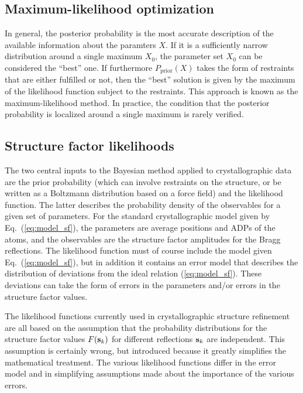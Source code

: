 \documentclass[11pt]{article}
\newcommand{\vect}[1]{{\bf #1}}
\newcommand{\vs}{\vect{s}}
\begin{document}
\begin{sloppy}
\subsection{Maximum-likelihood optimization}

In general, the posterior probability is the most accurate description
of the available information about the paramters $X$. If it is a
sufficiently narrow distribution around a single maximum $X_0$, the
parameter set $X_0$ can be considered the ``best'' one. If furthermore
$P_{\mbox{prior}}(X)$ takes the form of restraints that are either
fulfilled or not, then the ``best'' solution is given by the maximum
of the likelihood function subject to the restraints. This approach is
known as the maximum-likelihood method. In practice, the condition that
the posterior probability is localized around a single maximum is
rarely verified.

\subsection{Structure factor likelihoods}

The two central inputs to the Bayesian method applied to
crystallographic data are the prior probability (which can involve
restraints on the structure, or be written as a Boltzmann distribution
based on a force field) and the likelihood function. The latter
describes the probability density of the observables for a given set
of parameters. For the standard crystallographic model given by
Eq.~(\ref{eq:model_sf}), the parameters are average positions and ADPs
of the atoms, and the observables are the structure factor amplitudes
for the Bragg reflections. The likelihood function must of course
include the model given Eq.~(\ref{eq:model_sf}), but in addition it
contains an error model that describes the distribution of deviations
from the ideal relation (\ref{eq:model_sf}). These deviations can take
the form of errors in the parameters and/or errors in the structure factor
values.

The likelihood functions currently used in crystallographic structure
refinement are all based on the assumption that the probability
distributions for the structure factor values $F(\vs_k)$ for different
reflections $\vs_k$ are independent. This assumption is certainly
wrong, but introduced because it greatly simplifies the mathematical
treatment. The various likelihood functions differ in the error model
and in simplifying assumptions made about the importance of the various
errors.


\end{sloppy}
\end{document}
